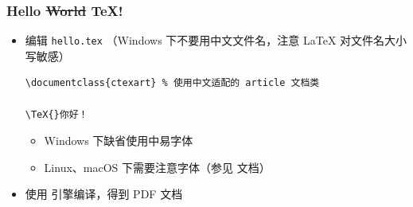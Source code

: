 
\begin{frame}[fragile]
  \frametitle{Hello \sout{World} \TeX!}

  \begin{itemize}
    \item 编辑 \texttt{hello.tex} （Windows 下不要用中文文件名，注意
      \LaTeX{} 对文件名大小写敏感）
      \lstset{language=[LaTeX]TeX}
      \begin{card} \begin{lstlisting}[basicstyle=\ttfamily]
\documentclass{ctexart} % 使用中文适配的 article 文档类

\TeX{}你好！

        \end{lstlisting}\end{card}
      \begin{itemize}
        \item Windows 下缺省使用中易字体
        \item Linux、macOS 下需要注意字体（参见  文档）
      \end{itemize}
    \item 使用 \XeLaTeX{} 引擎编译，得到 PDF 文档
      \begin{center}
      \end{center}
  \end{itemize}
\end{frame}

